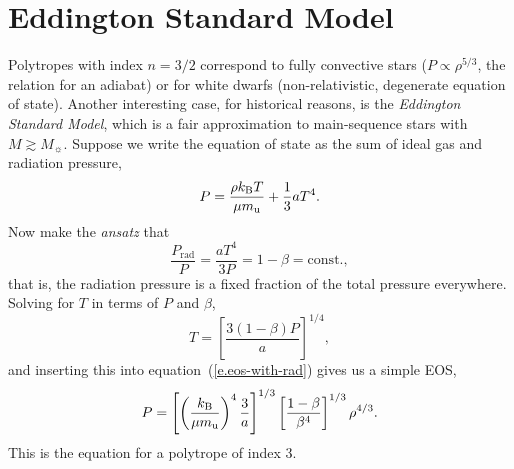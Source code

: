 \chapter{Eddington Standard Model}\label{s.LE-Eddington-Standard-Model}

Polytropes with index $n=3/2$ correspond to fully convective stars ($P \propto \rho^{5/3}$, the relation for an adiabat) or for white dwarfs (non-relativistic, degenerate equation of state). Another interesting case, for historical reasons, is the \emph{Eddington Standard Model}, which is a fair approximation to main-sequence stars with $M \gtrsim M_{\sun}$.  Suppose we write the equation of state as the sum of ideal gas and radiation pressure,
\begin{equation}\label{e.eos-with-rad}
 P  = \frac{\rho k_\mathrm{B} T}{\mu m_\mathrm{u}} + \frac{1}{3}a T^{4}.
\end{equation}
Now make the \emph{ansatz} that
\begin{equation}\label{e.beta-def}
\frac{P_{\mathrm{rad}}}{P} = \frac{aT^{4}}{3P} = 1-\beta = \mathrm{const.},
\end{equation}
that is, the radiation pressure is a fixed fraction of the total pressure everywhere.
Solving for $T$ in terms of $P$ and $\beta$,
\[ T = \left[\frac{3(1-\beta) P}{a}\right]^{1/4}, \]
and inserting this into equation~(\ref{e.eos-with-rad}) gives us a simple EOS,
\begin{equation}\label{e.beta-eos}
P = \left[\left(\frac{k_\mathrm{B}}{\mu m_\mathrm{u}}\right)^{4}\frac{3}{a}\right]^{1/3}\left[\frac{1-\beta}{\beta^{4}}\right]^{1/3} \rho^{4/3}.
\end{equation}
This is the equation for a polytrope of index 3.

